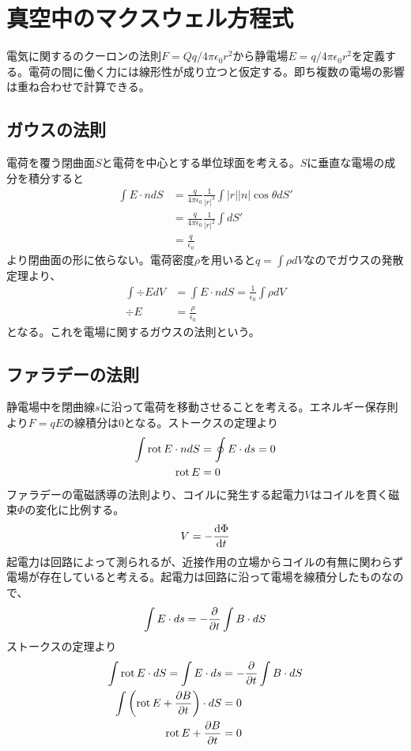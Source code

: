 \section{真空中のマクスウェル方程式}

電気に関するのクーロンの法則$F = Qq / 4\pi\epsilon_0r^2$から静電場$E = q / 4\pi\epsilon_0r^2$を定義する。電荷の間に働く力には線形性が成り立つと仮定する。即ち複数の電場の影響は重ね合わせで計算できる。

\subsection{ガウスの法則}
    電荷を覆う閉曲面$S$と電荷を中心とする単位球面を考える。$S$に垂直な電場の成分を積分すると
    \begin{align*}
        \int E \cdot n dS
            &= \frac{q}{4\pi\epsilon_0}\frac{1}{|r|^3}\int |r||n|\cos\theta dS'\\
            &= \frac{q}{4\pi\epsilon_0}\frac{1}{|r|^2}\int dS'\\
            &= \frac{q}{\epsilon_0}
    \end{align*}
    より閉曲面の形に依らない。電荷密度$\rho$を用いると$q = \int \rho dV$なのでガウスの発散定理より、
    \begin{align*}
        \int \div E dV &= \int E \cdot n dS = \frac{1}{\epsilon_0} \int \rho dV\\
        \div E &= \frac{\rho}{\epsilon_0}
    \end{align*}
    となる。これを電場に関するガウスの法則という。

\subsection{ファラデーの法則}
    静電場中を閉曲線$s$に沿って電荷を移動させることを考える。エネルギー保存則より$F = qE$の線積分は0となる。ストークスの定理より
    \begin{align*}
        \int \operatorname{rot} E \cdot ndS &= \oint E \cdot ds = 0\\
        \operatorname{rot} E &= 0
    \end{align*}
    ファラデーの電磁誘導の法則より、コイルに発生する起電力$V$はコイルを貫く磁束$\Phi$の変化に比例する。
        \[V = -\dv{\Phi}{t}\]
    起電力は回路によって測られるが、近接作用の立場からコイルの有無に関わらず電場が存在していると考える。起電力は回路に沿って電場を線積分したものなので、
        \[\int E \cdot ds = -\pdv{t} \int B \cdot dS\]
    ストークスの定理より
    \begin{align*}
        \int \operatorname{rot} E \cdot dS = \int E \cdot ds &= -\pdv{t} \int B \cdot dS\\
        \int \left(\operatorname{rot} E + \pdv{B}{t}\right) \cdot dS &= 0\\
        \operatorname{rot} E + \pdv{B}{t} &= 0
    \end{align*}

